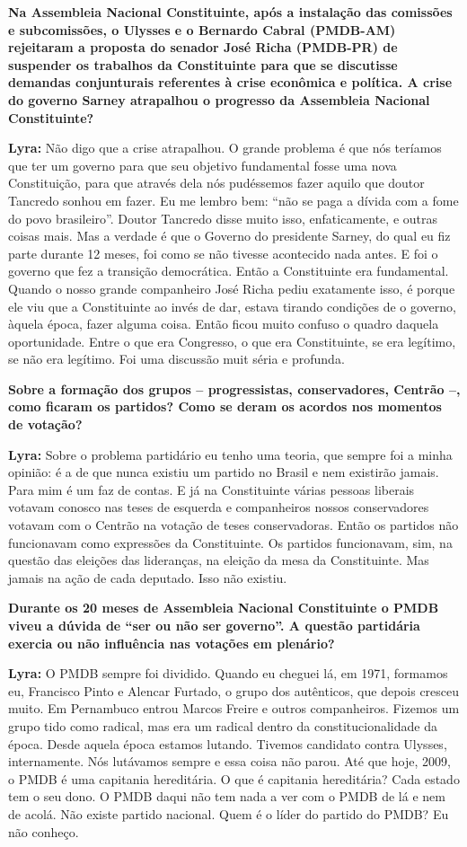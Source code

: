\textbf{Na Assembleia Nacional Constituinte, após a instalação das
comissões e subcomissões, o Ulysses e o Bernardo Cabral (PMDB-AM)
rejeitaram a proposta do senador José Richa (PMDB-PR) de suspender os
trabalhos da Constituinte para que se discutisse demandas conjunturais
referentes à crise econômica e política. A crise do governo Sarney
atrapalhou o progresso da Assembleia Nacional Constituinte?}

\textbf{Lyra:} Não digo que a crise atrapalhou. O grande problema é que
nós teríamos que ter um governo para que seu objetivo fundamental fosse
uma nova Constituição, para que através dela nós pudéssemos fazer aquilo
que doutor Tancredo sonhou em fazer. Eu me lembro bem: ``não se paga a
dívida com a fome do povo brasileiro''. Doutor Tancredo disse muito
isso, enfaticamente, e outras coisas mais. Mas a verdade é que o Governo
do presidente Sarney, do qual eu fiz parte durante 12 meses, foi como se
não tivesse acontecido nada antes. E foi o governo que fez a transição
democrática. Então a Constituinte era fundamental. Quando o nosso grande
companheiro José Richa pediu exatamente isso, é porque ele viu que a
Constituinte ao invés de dar, estava tirando condições de o governo,
àquela época, fazer alguma coisa. Então ficou muito confuso o quadro
daquela oportunidade. Entre o que era Congresso, o que era Constituinte,
se era legítimo, se não era legítimo. Foi uma discussão muit séria e
profunda.

\textbf{Sobre a formação dos grupos -- progressistas, conservadores,
Centrão --, como ficaram os partidos? Como se deram os acordos nos
momentos de votação?}

\textbf{Lyra:} Sobre o problema partidário eu tenho uma teoria, que
sempre foi a minha opinião: é a de que nunca existiu um partido no
Brasil e nem existirão jamais. Para mim é um faz de contas. E já na
Constituinte várias pessoas liberais votavam conosco nas teses de
esquerda e companheiros nossos conservadores votavam com o Centrão na
votação de teses conservadoras. Então os partidos não funcionavam como
expressões da Constituinte. Os partidos funcionavam, sim, na questão das
eleições das lideranças, na eleição da mesa da Constituinte. Mas jamais
na ação de cada deputado. Isso não existiu.

\textbf{Durante os 20 meses de Assembleia Nacional Constituinte o PMDB
viveu a dúvida de ``ser ou não ser governo''. A questão partidária
exercia ou não influência nas votações em plenário?}

\textbf{Lyra:} O PMDB sempre foi dividido. Quando eu cheguei lá, em
1971, formamos eu, Francisco Pinto e Alencar Furtado, o grupo dos
autênticos, que depois cresceu muito. Em Pernambuco entrou Marcos Freire
e outros companheiros. Fizemos um grupo tido como radical, mas era um
radical dentro da constitucionalidade da época. Desde aquela época
estamos lutando. Tivemos candidato contra Ulysses, internamente. Nós
lutávamos sempre e essa coisa não parou. Até que hoje, 2009, o PMDB é
uma capitania hereditária. O que é capitania hereditária? Cada estado
tem o seu dono. O PMDB daqui não tem nada a ver com o PMDB de lá e nem
de acolá. Não existe partido nacional. Quem é o líder do partido do
PMDB? Eu não conheço.

